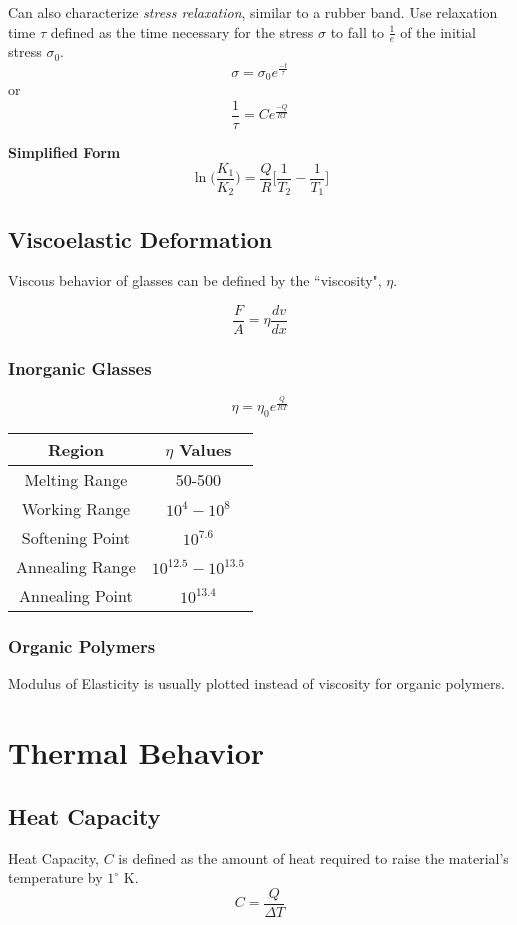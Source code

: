 \documentclass[10pt,letterpaper]{article}
\begin{document}
	Can also characterize \textit{stress relaxation}, similar to a rubber band.  Use relaxation time $\tau$ defined as the time necessary for the stress $\sigma$ to fall to $\frac{1}{e}$ of the initial stress $\sigma_0$. 
	$$
	\sigma = \sigma_0 e^{\frac{-t}{\tau}}
	$$
	or
	$$
	\frac{1}{\tau} = Ce^{\frac{-Q}{RT}}
	$$
	
	\textbf{Simplified Form}
	$$
	\ln \bigg( \frac{K_1}{K_2} \bigg) = \frac{Q}{R} \bigg[ \frac{1}{T_2} - \frac{1}{T_1} \bigg]
	$$
	
	\subsection{Viscoelastic Deformation}
	Viscous behavior of glasses can be defined by the ``viscosity", $\eta$. 
	
	$$
	\frac{F}{A} = \eta \frac{dv}{dx}
	$$
	
	\subsubsection*{Inorganic Glasses}
	$$
	\eta = \eta_0 e^\frac{Q}{RT}
	$$
	
	\begin{tabular}{|c|c|}
		\hline Region & $\eta$ Values \\ 
		\hline Melting Range & 50-500 \\ 
		\hline Working Range & $10^4 - 10^8$ \\ 
		\hline Softening Point & $10^{7.6}$ \\ 
		\hline Annealing Range & $10^{12.5}-10^{13.5}$ \\ 
		\hline Annealing Point & $10^{13.4}$ \\ 
		\hline 
	\end{tabular} 
	
	\subsubsection*{Organic Polymers}
	Modulus of Elasticity is usually plotted instead of viscosity for organic polymers. 
	
	\section{Thermal Behavior}
	\subsection{Heat Capacity} 
	Heat Capacity, $C$ is defined as the amount of heat required to raise the material's temperature by $1^{\circ}$ K. 
	$$
	C = \frac{Q}{\Delta T}
	$$
	
\end{document}
